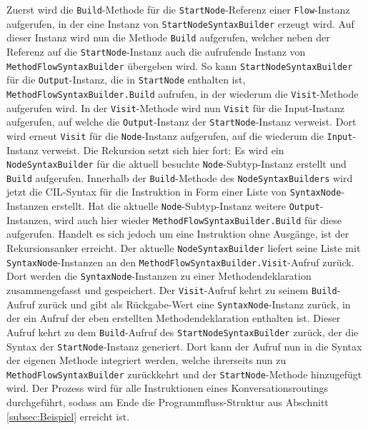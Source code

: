 Zuerst wird die \texttt{Build}-Methode für die \texttt{StartNode}-Referenz einer \texttt{Flow}-Instanz aufgerufen, in der eine Instanz von \texttt{StartNodeSyntaxBuilder} erzeugt wird. Auf dieser Instanz wird nun die Methode \texttt{Build} aufgerufen, welcher neben der Referenz auf die \texttt{StartNode}-Instanz auch die aufrufende Instanz von \texttt{MethodFlowSyntaxBuilder} übergeben wird. So kann \texttt{StartNodeSyntaxBuilder} für die \texttt{Output}-Instanz, die in \texttt{StartNode} enthalten ist, \texttt{MethodFlowSyntaxBuilder.Build} aufrufen, in der wiederum die \texttt{Visit}-Methode aufgerufen wird. In der \texttt{Visit}-Methode wird nun \texttt{Visit} für die Input-Instanz aufgerufen, auf welche die \texttt{Output}-Instanz der \texttt{StartNode}-Instanz verweist. Dort wird erneut \texttt{Visit} für die \texttt{Node}-Instanz aufgerufen, auf die wiederum die \texttt{Input}-Instanz verweist. Die Rekursion setzt sich hier fort: Es wird ein \texttt{NodeSyntaxBuilder} für die aktuell besuchte \texttt{Node}-Subtyp-Instanz erstellt und \texttt{Build} aufgerufen. Innerhalb der \texttt{Build}-Methode des \texttt{NodeSyntaxBuilders} wird jetzt die CIL-Syntax für die Instruktion in Form einer Liste von \texttt{SyntaxNode}-Instanzen erstellt. Hat die aktuelle \texttt{Node}-Subtyp-Instanz weitere \texttt{Output}-Instanzen, wird auch hier wieder \texttt{MethodFlowSyntaxBuilder.Build} für diese aufgerufen. Handelt es sich jedoch um eine Instruktion ohne Ausgänge, ist der Rekursionsanker erreicht. Der aktuelle \texttt{NodeSyntaxBuilder} liefert seine Liste mit \texttt{SyntaxNode}-Instanzen an den \texttt{MethodFlowSyntaxBuilder.Visit}-Aufruf zurück. Dort werden die \texttt{SyntaxNode}-Instanzen zu einer Methodendeklaration zusammengefasst und gespeichert. Der \texttt{Visit}-Aufruf kehrt zu seinem \texttt{Build}-Aufruf zurück und gibt als Rückgabe-Wert eine \texttt{SyntaxNode}-Instanz zurück, in der ein Aufruf der eben erstellten Methodendeklaration enthalten ist. Dieser Aufruf kehrt zu dem \texttt{Build}-Aufruf des \texttt{StartNodeSyntaxBuilder} zurück, der die Syntax der \texttt{StartNode}-Instanz generiert. Dort kann der Aufruf nun in die Syntax der eigenen Methode integriert werden, welche ihrerseits nun zu \texttt{MethodFlowSyntaxBuilder} zurückkehrt und der \texttt{StartNode}-Methode hinzugefügt wird. Der Prozess wird für alle Instruktionen eines Konversationsroutings durchgeführt, sodass am Ende die Programmfluss-Struktur aus Abschnitt \ref{subsec:Beispiel} erreicht ist.

